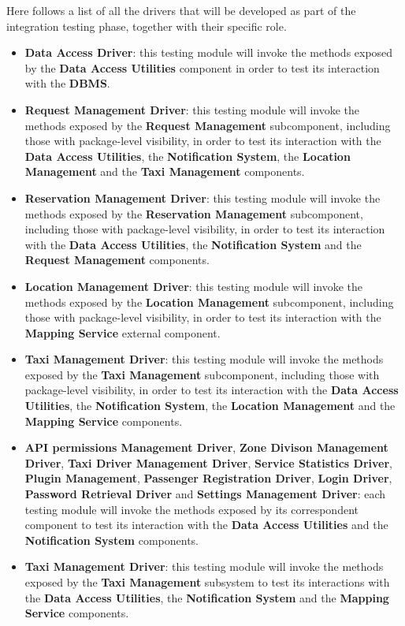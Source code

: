 Here follows a list of all the drivers that will be developed as part of the integration testing phase, together with their specific role.
\begin{itemize}
	\item \textbf{Data Access Driver}: this testing module will invoke the methods exposed by the \textbf{Data Access Utilities} component in order to test its interaction with the \textbf{DBMS}.
	\item \textbf{Request Management Driver}: this testing module will invoke the methods exposed by the \textbf{Request Management} subcomponent, including those with package-level visibility, in order to test its interaction with the \textbf{Data Access Utilities}, the \textbf{Notification System}, the \textbf{Location Management} and the \textbf{Taxi Management} components. 
	\item \textbf{Reservation Management Driver}: this testing module will invoke the methods exposed by the \textbf{Reservation Management} subcomponent, including those with package-level visibility, in order to test its interaction with the \textbf{Data Access Utilities}, the \textbf{Notification System} and the \textbf{Request Management} components. 
	\item \textbf{Location Management Driver}: this testing module will invoke the methods exposed by the \textbf{Location Management} subcomponent, including those with package-level visibility, in order to test its interaction with the \textbf{Mapping Service} external component.
	\item \textbf{Taxi Management Driver}: this testing module will invoke the methods exposed by the \textbf{Taxi Management} subcomponent, including those with package-level visibility, in order to test its interaction with the \textbf{Data Access Utilities}, the \textbf{Notification System}, the \textbf{Location Management} and the \textbf{Mapping Service} components.
	\item \textbf{API permissions Management Driver}, \textbf{Zone Divison Management Driver}, \textbf{Taxi Driver Management Driver}, \textbf{Service Statistics Driver}, \textbf{Plugin Management}, \textbf{Passenger Registration Driver}, \textbf{Login Driver}, \textbf{Password Retrieval Driver} and \textbf{Settings Management Driver}: each testing module will invoke the methods exposed by its correspondent component to test its interaction with the \textbf{Data Access Utilities} and the \textbf{Notification System} components.
	\item \textbf{Taxi Management Driver}: this testing module will invoke the methods exposed by the \textbf{Taxi Management} subsystem to test its interactions with the \textbf{Data Access Utilities}, the \textbf{Notification System} and the \textbf{Mapping Service} components. 

\end{itemize}
